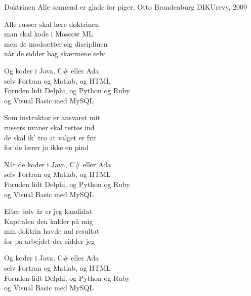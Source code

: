 \begin{song}{Doktrinen}
  {} %
  {Alle sømænd er glade for piger, Otto Brandenburg} %
  {} %
  {DIKUrevy, 2009} %
  {\NotCCLIed} %

  \begin{SBVerse}
    Alle russer skal lære doktrinen\\
    man skal kode i Moscow ML\\
    men de modsætter sig disciplinen\\
    når de sidder bag skærmene selv
  \end{SBVerse}

  \begin{SBChorus}
    Og koder i Java, C\# eller Ada\\
    selv Fortran og Matlab, og HTML\\
    Foruden lidt Delphi, og Python og Ruby\\
    og Visual Basic med MySQL
  \end{SBChorus}

  \begin{SBVerse}
    Som instruktor er ansvaret mit\\
    russers uvaner skal rettes ind\\
    de skal ik' tro at valget er frit\\
    for de lærer jo ikke en pind
  \end{SBVerse}

  \begin{SBChorus}
    Når de koder i Java, C\# eller Ada\\
    selv Fortran og Matlab, og HTML\\
    Foruden lidt Delphi, og Python og Ruby\\
    og Visual Basic med MySQL
  \end{SBChorus}

  \begin{SBVerse}
    Efter tolv år er jeg kandidat\\
    Kapitalen den kalder på mig\\
    min doktrin havde nul resultat\\
    for på arbejdet der sidder jeg
  \end{SBVerse}

  \begin{SBChorus}
    Og koder i Java, C\# eller Ada\\
    selv Fortran og Matlab, og HTML\\
    Foruden lidt Delphi, og Python og Ruby\\
    og Visual Basic med MySQL
  \end{SBChorus}
\end{song}